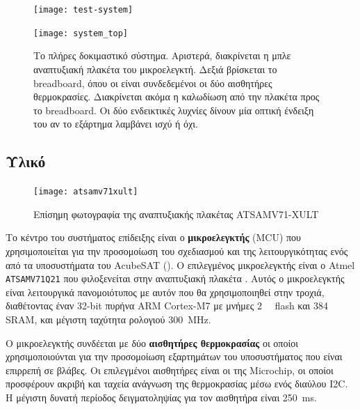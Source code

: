 \documentclass[a4paper,nobib]{tufte-book}
\begin{document}
\begin{figure}
	\texttt{[image: test-system]}\par
	\vspace*{3ex}
	\texttt{[image: system\_top]}
	\caption[Το πλήρες αναπτυξιακό σύστημα]{Το πλήρες δοκιμαστικό σύστημα. Αριστερά, διακρίνεται η μπλε αναπτυξιακή πλακέτα του μικροελεγκτή. Δεξιά βρίσκεται το breadboard, όπου οι είναι συνδεδεμένοι οι δύο αισθητήρες θερμοκρασίες. Διακρίνεται ακόμα η καλωδίωση από την πλακέτα προς το breadboard. Οι δύο ενδεικτικές λυχνίες δίνουν μία οπτική ένδειξη του αν το εξάρτημα λαμβάνει ισχύ ή όχι.}
\end{figure}

\subsection{Υλικό}

\begin{figure}
	\centering
	\texttt{[image: atsamv71xult]}
	\caption{Επίσημη φωτογραφία της αναπτυξιακής πλακέτας ATSAMV71-XULT}
\end{figure}

Το κέντρο του συστήματος επίδειξης είναι ο \textbf{μικροελεγκτής} (\ac{MCU}) που χρησιμοποιείται για την προσομοίωση του σχεδιασμού και της λειτουργικότητας ενός από τα υποσυστήματα του AcubeSAT (). Ο επιλεγμένος μικροελεγκτής είναι ο Atmel \texttt{ATSAMV71Q21} που φιλοξενείται στην αναπτυξιακή πλακέτα . Αυτός ο μικροελεγκτής είναι λειτουργικά πανομοιότυπος με αυτόν που θα χρησιμοποιηθεί στην τροχιά, διαθέτοντας έναν 32-bit πυρήνα ARM Cortex-M7 με μνήμες \SI{2}{\mebi\byte} flash και \SI{384}{\kibi\byte} \acs{SRAM}, και μέγιστη ταχύτητα ρολογιού \SI{300}{\mega\hertz}.

Ο μικροελεγκτής συνδέεται με δύο \textbf{αισθητήρες θερμοκρασίας} οι οποίοι χρησιμοποιούνται για την προσομοίωση εξαρτημάτων του υποσυστήματος που είναι επιρρεπή σε βλάβες. Οι επιλεγμένοι αισθητήρες είναι οι  της Microchip, οι οποίοι προσφέρουν ακριβή και ταχεία ανάγνωση της θερμοκρασίας μέσω ενός διαύλου \ac{I2C}. Η μέγιστη δυνατή περίοδος δειγματοληψίας για τον αισθητήρα είναι \SI{250}{\milli\second}.

\end{document}
